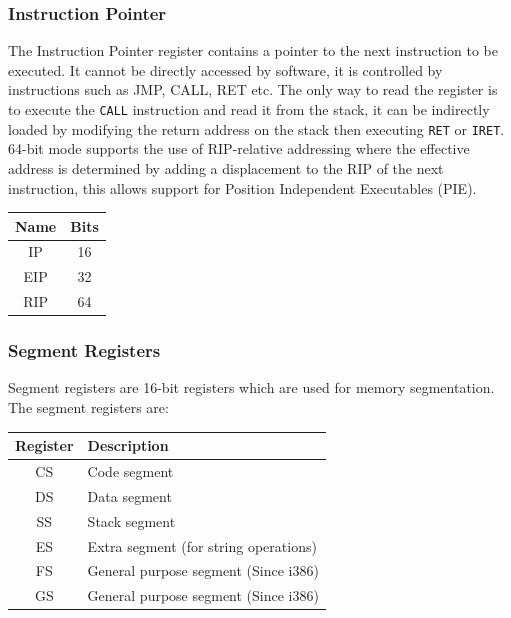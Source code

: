 \documentclass{article}
\newcommand{\layout}[1]{\parbox{\linewidth}{#1}}
\begin{document}
\layout{
  \subsubsection{Instruction Pointer}

  The Instruction Pointer register contains a pointer to the next instruction to be executed.
  It cannot be directly accessed by software, it is controlled by instructions such as JMP, CALL, RET etc.
  The only way to read the register is to execute the \texttt{CALL} instruction and read it from the stack, it can be indirectly loaded by modifying the return address on the stack then executing \texttt{RET} or \texttt{IRET}.
  64-bit mode supports the use of RIP-relative addressing where the effective address is determined by adding a displacement to the RIP of the next instruction, this allows support for Position Independent Executables (PIE).

  \begin{table}[H]
    \centering
    \begin{tabular}{|c|c|}
      \hline \textbf{Name} & \textbf{Bits} \\ \hline
      IP & 16 \\
      EIP & 32 \\
      RIP & 64 \\ \hline
    \end{tabular}
  \end{table}

  \cite[Chapter~3.5]{sdm1}
}

\layout{
  \subsubsection{Segment Registers}

  Segment registers are 16-bit registers which are used for memory segmentation.
  The segment registers are:

  \begin{table}[H]
    \centering
    \begin{tabular}{|c|l|}
      \hline \textbf{Register} & \textbf{Description} \\ \hline
      CS & Code segment \\
      DS & Data segment \\
      SS & Stack segment \\
      ES & Extra segment (for string operations) \\
      FS & General purpose segment (Since i386) \\
      GS & General purpose segment (Since i386) \\ \hline
    \end{tabular}
  \end{table}
}
\end{document}
